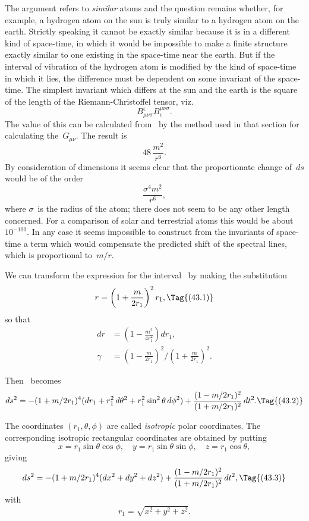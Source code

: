 \documentclass[12pt]{book}
\begin{document}
The argument refers to \emph{similar} atoms and the question remains whether,
for example, a hydrogen atom on the sun is truly similar to a hydrogen atom
on the earth. Strictly speaking it cannot be exactly similar because it is in a
different kind of space-time, in which it would be impossible to make a finite
structure exactly similar to one existing in the space-time near the earth. But
if the interval of vibration of the hydrogen atom is modified by the kind of
space-time in which it lies, the difference must be dependent on some invariant
of the space-time. The simplest invariant which differs at the sun and the
earth is the square of the length of the Riemann\hyp{}Christoffel tensor, viz.\
\[
B_{\mu\nu\sigma}^{\epsilon} B_{\epsilon}^{\mu\nu\sigma}.
\]
The value of this can be calculated from~ by the method used in that
section for calculating the~$G_{\mu\nu}$. The result is
\[
48\, \frac{m^{2}}{r^{6}}.
\]
By consideration of dimensions it seems clear that the proportionate change
of~$ds$ would be of the order
\[
\frac{\sigma^{4} m^{2}}{r^{6}},
\]
where $\sigma$~is the radius of the atom; there does not seem to be any other length
concerned. For a comparison of solar and terrestrial atoms this would be about
$10^{-100}$. In any case it seems impossible to construct from the invariants of
space-time a term which would compensate the predicted shift of the spectral
lines, which is proportional to~$m/r$.

%
%

We can transform the expression for the interval~ by making the
substitution
\[
r = \left(1 + \frac{m}{2r_{1}}\right)^{2} r_{1},
\Tag{(43.1)}
\]
so that
\begin{align*}
dr &= \left(1 - \frac{m^{2}}{4r_{1}^{2}}\right) dr_{1}, \\
\gamma &= \left(1 - \frac{m}{2r_{1}}\right)^{2}\bigg/\left(1 + \frac{m}{2r_{1}}\right)^{2}.
\end{align*}

Then ~becomes
\[
  ds^{2} = -(1 + m/2r_{1})^{4} (dr_{1} + r_{1}^{2}\, d\theta^2 + r_{1}^{2}\sin^{2}\theta\, d\phi^{2})
  + \frac{(1 - m/2r_{1})^{2}}{(1 + m/2r_{1})^{2}}\, dt^{2}.
  \Tag{(43.2)}
\]

The coordinates $(r_{1},\theta, \phi)$ are called \emph{isotropic} polar coordinates. The corresponding
isotropic rectangular coordinates are obtained by putting
\[
x = r_{1} \sin\theta \cos\phi,\quad
y = r_{1} \sin\theta \sin\phi,\quad
z = r_{1} \cos\theta,
\]
giving
\[
ds^{2} = -(1 + m/2r_{1})^{4} (dx^{2} + dy^{2} + dz^{2})
+ \frac{(1 - m/2r_{1})^{2}}{(1 + m/2r_{1})^{2}}\, dt^{2},
\Tag{(43.3)}
\]
with
\[
r_{1} = \sqrt{x^{2} + y^{2} + z^{2}}.
\]
\end{document}
